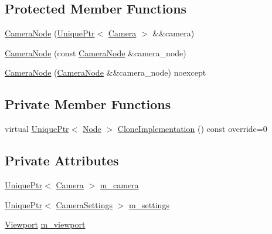 \subsection*{Protected Member Functions}
\begin{DoxyCompactItemize}
\item 
\hyperlink{classmage_1_1_camera_node_af69c99023f20f22922269866ea377c40}{Camera\+Node} (\hyperlink{namespacemage_a3316d7143a973e37adf1110f2e80ca31}{Unique\+Ptr}$<$ \hyperlink{classmage_1_1_camera}{Camera} $>$ \&\&camera)
\item 
\hyperlink{classmage_1_1_camera_node_aa0becc29c416c313ebda763edb1b2181}{Camera\+Node} (const \hyperlink{classmage_1_1_camera_node}{Camera\+Node} \&camera\+\_\+node)
\item 
\hyperlink{classmage_1_1_camera_node_a6ed405e70c5105f36938bdbc66c15fc4}{Camera\+Node} (\hyperlink{classmage_1_1_camera_node}{Camera\+Node} \&\&camera\+\_\+node) noexcept
\end{DoxyCompactItemize}
\subsection*{Private Member Functions}
\begin{DoxyCompactItemize}
\item 
virtual \hyperlink{namespacemage_a3316d7143a973e37adf1110f2e80ca31}{Unique\+Ptr}$<$ \hyperlink{classmage_1_1_node}{Node} $>$ \hyperlink{classmage_1_1_camera_node_a002d3a2b41cda270a26ca5d8f3a17f55}{Clone\+Implementation} () const override=0
\end{DoxyCompactItemize}
\subsection*{Private Attributes}
\begin{DoxyCompactItemize}
\item 
\hyperlink{namespacemage_a3316d7143a973e37adf1110f2e80ca31}{Unique\+Ptr}$<$ \hyperlink{classmage_1_1_camera}{Camera} $>$ \hyperlink{classmage_1_1_camera_node_a18f00f7ccd0c677043e11a1b3085dbfb}{m\+\_\+camera}
\item 
\hyperlink{namespacemage_a3316d7143a973e37adf1110f2e80ca31}{Unique\+Ptr}$<$ \hyperlink{classmage_1_1_camera_settings}{Camera\+Settings} $>$ \hyperlink{classmage_1_1_camera_node_aa8b1f1204534b3ee271e62b7cfe0f833}{m\+\_\+settings}
\item 
\hyperlink{classmage_1_1_viewport}{Viewport} \hyperlink{classmage_1_1_camera_node_a338e6f3112a167a7f81de59c7e33e87b}{m\+\_\+viewport}
\end{DoxyCompactItemize}


